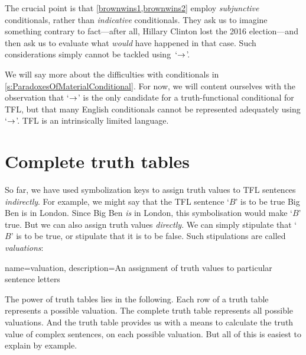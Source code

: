 The crucial point is that \cref*{brownwins1,brownwins2} employ \emph{subjunctive} conditionals, rather than \emph{indicative} conditionals. They ask us to imagine something contrary to fact---after all, Hillary Clinton lost the 2016 election---and then ask us to evaluate what \emph{would} have happened in that case. Such considerations simply cannot be tackled using~`$\rightarrow$'.

We will say more about the difficulties with conditionals in \cref{s:ParadoxesOfMaterialConditional}. For now, we will content ourselves with the observation that `$\rightarrow$' is the only candidate for a truth-functional conditional for TFL, but that many English conditionals cannot be represented adequately using `$\rightarrow$'. TFL is an intrinsically limited language.


\chapter{Complete truth tables}
\label{s:CompleteTruthTables}

So far, we have used symbolization keys to assign truth values to TFL sentences \emph{indirectly}. For example, we might say that the TFL sentence `$B$' is to be true \ifeff{} Big Ben is in London. Since Big Ben \emph{is} in London, this symbolisation would make `$B$' true. But we can also assign truth values \emph{directly}. We can simply stipulate that `$B$' is to be true, or stipulate that it is to be false. Such stipulations are called \emph{valuations}: 

{
name=valuation,
description={An assignment of \glspl{truth value} to particular \glspl{sentence letter}}
}

The power of truth tables lies in the following. Each row of a truth table represents a possible valuation. The complete truth table represents all possible valuations. And the truth table provides us with a means to calculate the truth value of complex sentences, on each possible valuation. But all of this is easiest to explain by example.

